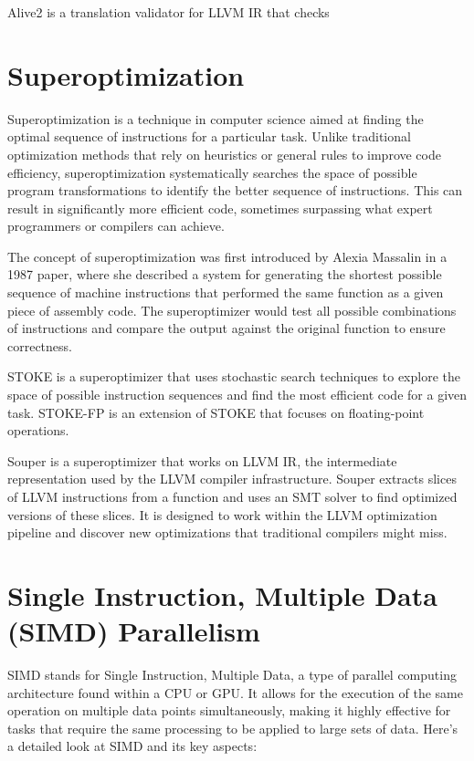Alive2 is a translation validator for LLVM IR that checks



\section{Superoptimization}
\label{sec:superoptimization}


Superoptimization is a technique in computer science aimed at finding
the optimal sequence of instructions for a particular task.
%
Unlike traditional optimization methods that rely on heuristics or
general rules to improve code efficiency, superoptimization
systematically searches the space of possible program transformations
to identify the better sequence of instructions.
%
This can result in significantly more efficient code, sometimes
surpassing what expert programmers or compilers can achieve.

The concept of superoptimization was first introduced by Alexia
Massalin in a 1987 paper, where she described a system for generating
the shortest possible sequence of machine instructions that performed
the same function as a given piece of assembly code. The
superoptimizer would test all possible combinations of instructions
and compare the output against the original function to ensure
correctness.

STOKE is a superoptimizer that uses stochastic search techniques to
explore the space of possible instruction sequences and find the most
efficient code for a given task. STOKE-FP is an extension of STOKE
that focuses on floating-point operations.

Souper is a superoptimizer that works on LLVM IR, the intermediate
representation used by the LLVM compiler infrastructure. Souper
extracts slices of LLVM instructions from a function and uses an SMT
solver to find optimized versions of these slices. It is designed to
work within the LLVM optimization pipeline and discover new
optimizations that traditional compilers might miss.

\section{Single Instruction, Multiple Data (SIMD) Parallelism}
\label{sec:simd}

SIMD stands for Single Instruction, Multiple Data, a type of parallel
computing architecture found within a CPU or GPU. It allows for the
execution of the same operation on multiple data points
simultaneously, making it highly effective for tasks that require the
same processing to be applied to large sets of data. Here's a detailed
look at SIMD and its key aspects:

